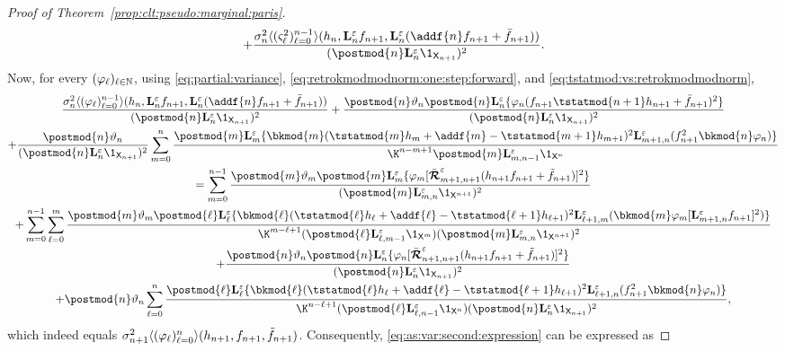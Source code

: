 \begin{proof}[Proof of Theorem~\ref{prop:clt:pseudo:marginal:paris}]
\begin{multline*}
+ \frac{\sigma^2_n \langle (\ukestvar{\ell})_{\ell = 0}^{n - 1} \rangle(h_n, \ukmod{n} f_{n + 1}, \ukmod{n}(\addf{n} f_{n + 1} + \bar{f}_{n + 1}))}{(\postmod{n} \ukmod{n} \1_{\Xset_{n + 1}})^2}. 
\end{multline*}
Now, for every $(\varphi_\ell)_{\ell \in \mathbb{N}}$, using \eqref{eq:partial:variance}, \eqref{eq:retrokmodmodnorm:one:step:forward}, and \eqref{eq:tstatmod:vs:retrokmodmodnorm}, 
\begin{multline*}
\frac{\sigma^2_n \langle (\varphi_\ell)_{\ell = 0}^{n - 1} \rangle(h_n, \ukmod{n} f_{n + 1}, \ukmod{n}(\addf{n} f_{n + 1} + \bar{f}_{n + 1}))}{(\postmod{n} \ukmod{n} \1_{\Xset_{n + 1}})^2} 
+ \frac{\postmod{n} \adjfuncforward{n} \postmod{n} \ukmod{n} \{\varphi_n(f_{n + 1} \tstatmod{n + 1} h_{n + 1} + \bar{f}_{n + 1})^2 \}}{(\postmod{n} \ukmod{n} \1_{\Xset_{n + 1}})^2} \\
+ \frac{\postmod{n} \adjfuncforward{n}}{(\postmod{n} \ukmod{n} \1_{\Xset_{n + 1}})^2} \sum_{m = 0}^n \frac{\postmod{m} \ukmod{m}\{\bkmod{m}(\tstatmod{m} h_m + \addf{m} - \tstatmod{m + 1} h_{m + 1})^2 \ukmod{m + 1, n}(f_{n + 1}^2 \bkmod{n} \varphi_n)\}}{\K^{n - m + 1} \postmod{m} \ukmod{m, n - 1} \1_{\Xset^n}} \\
= \sum_{m = 0}^{n - 1} \frac{\postmod{m} \adjfuncforward{m} \postmod{m} \ukmod{m} \{ \varphi_m [\retrokmodmodnorm_{m + 1, n + 1} (h_{n + 1} f_{n + 1} + \ftd{n + 1})]^2\}}{(\postmod{m} \ukmod{m, n} \1_{\Xset^{n + 1}})^2} \\
+ \sum_{m = 0}^{n - 1} \sum_{\ell = 0}^m \frac{\postmod{m} \adjfuncforward{m} \postmod{\ell} \ukmod{\ell} \{\bkmod{\ell}(\tstatmod{\ell} h_{\ell} + \addf{\ell} - \tstatmod{\ell + 1} h_{\ell +1})^2 \ukmod{\ell + 1, m}( \bkmod{m} \varphi_m 
[\ukmod{m + 1, n} f_{n + 1}]^2 
)\}}{\K^{m - \ell + 1} (\postmod{\ell} \ukmod{\ell, m - 1} \1_{\Xset^m})(\postmod{m} \ukmod{m, n} \1_{\Xset^{n + 1}})^2} \\
+ \frac{\postmod{n} \adjfuncforward{n} \postmod{n} \ukmod{n} \{ \varphi_n  
[\retrokmodmodnorm_{n + 1, n + 1} (h_{n + 1} f_{n + 1} + \ftd{n + 1})]^2 
\}}{(\postmod{n} \ukmod{n} \1_{\Xset_{n + 1}})^2} \\
+ \postmod{n} \adjfuncforward{n} \sum_{\ell = 0}^n \frac{\postmod{\ell} \ukmod{\ell} \{\bkmod{\ell}(\tstatmod{\ell} h_\ell + \addf{\ell} - \tstatmod{\ell + 1} h_{\ell + 1})^2 \ukmod{\ell + 1, n}(f_{n + 1}^2 \bkmod{n} \varphi_n)\}}{\K^{n - \ell + 1} (\postmod{\ell} \ukmod{\ell, n - 1} \1_{\Xset^n}) (\postmod{n} \ukmod{n} \1_{\Xset_{n + 1}})^2}, 
\end{multline*}
which indeed equals $\sigma^2_{n + 1} \langle (\varphi_\ell)_{\ell = 0}^n \rangle(h_{n + 1}, f_{n + 1}, \tilde{f}_{n + 1})$. Consequently, \eqref{eq:as:var:second:expression} can be expressed as 

\end{proof}
